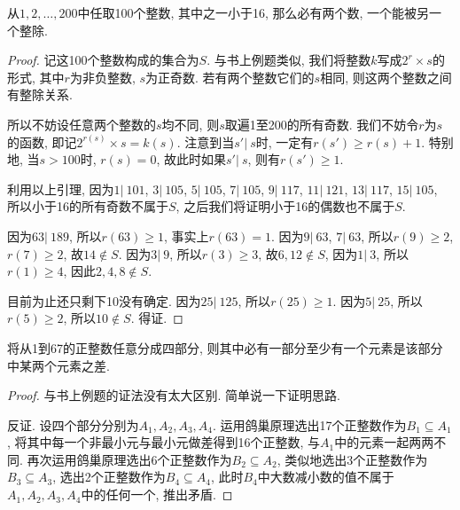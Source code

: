 \documentclass[chinese]{assignment}[2019/10/15]
\begin{document}
    \begin{problem}
       从$1, 2, \dotsc, 200$中任取100个整数, 其中之一小于16, 那么必有两个数, 一个能被另一个整除.
    \end{problem}
    \begin{proof}
        记这100个整数构成的集合为$S$. 与书上例题类似, 我们将整数$k$写成$2^{r}\times s$的形式, 其中$r$为非负整数, $s$为正奇数. 若有两个整数它们的$s$相同, 则这两个整数之间有整除关系.

        所以不妨设任意两个整数的$s$均不同, 则$s$取遍1至200的所有奇数. 我们不妨令$r$为$s$的函数, 即记$2^{r(s)}\times s=k(s)$. 注意到当$s' |\ s$时, 一定有$r(s')\geq r(s)+1$. 特别地, 当$s>100$时, $r(s)=0$, 故此时如果$s' |\ s$, 则有$r(s')\geq 1$.

        利用以上引理, 因为$1|\ 101$, $3|\ 105$, $5|\ 105$, $7|\ 105$, $9|\ 117$, $11|\ 121$, $13|\ 117$, $15|\ 105$, 所以小于16的所有奇数不属于$S$, 之后我们将证明小于16的偶数也不属于$S$.

        因为$63|\ 189$, 所以$r(63)\geq 1$, 事实上$r(63)=1$. 因为$9|\ 63$, $7|\ 63$, 所以$r(9)\geq 2$, $r(7)\geq 2$, 故$14\notin S$. 因为$3|\ 9$, 所以$r(3)\geq 3$, 故$6, 12\notin S$, 因为$1|\ 3$, 所以$r(1)\geq 4$, 因此$2, 4, 8\notin S$.

        目前为止还只剩下10没有确定. 因为$25|\ 125$, 所以$r(25)\geq 1$. 因为$5|\ 25$, 所以$r(5)\geq 2$, 所以$10\notin S$. 得证.
    \end{proof}

    \begin{problem}
       将从1到67的正整数任意分成四部分, 则其中必有一部分至少有一个元素是该部分中某两个元素之差.
    \end{problem}
    \begin{proof}
        与书上例题的证法没有太大区别. 简单说一下证明思路.

        反证. 设四个部分分别为$A_1, A_2, A_3, A_4$. 运用鸽巢原理选出17个正整数作为$B_1\subseteq A_1$, 将其中每一个非最小元与最小元做差得到16个正整数, 与$A_1$中的元素一起两两不同. 再次运用鸽巢原理选出6个正整数作为$B_2\subseteq A_2$, 类似地选出3个正整数作为$B_3\subseteq A_3$, 选出2个正整数作为$B_4\subseteq A_4$, 此时$B_4$中大数减小数的值不属于$A_1, A_2, A_3, A_4$中的任何一个, 推出矛盾.
    \end{proof}
\end{document}
